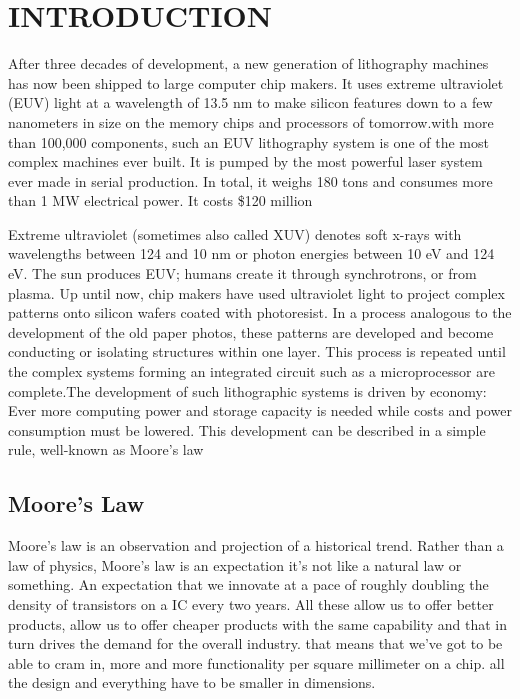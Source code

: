 \documentclass[12pt,a4paper]{report}
\begin{document}
\tableofcontents %
\listoffigures




    

\chapter{INTRODUCTION}
After three decades of development, a new generation of 
lithography machines has now been shipped to large 
computer chip makers. It uses extreme ultraviolet (EUV) 
light at a wavelength of 13.5 nm to make silicon 
features down to a few nanometers in size on the 
memory chips and processors of tomorrow.with more than 
100,000 components, such an EUV 
lithography system is one of the most complex 
machines ever built. It is pumped by the most 
powerful laser system ever made in serial production. 
In total, it weighs 180 tons and consumes more than 
1 MW electrical power. It costs \$120 million

Extreme ultraviolet (sometimes also called XUV) denotes 
soft x-rays with wavelengths between 124 and 10 nm or
 photon energies between 10 eV and 124 eV. 
 The sun produces EUV; humans create it through 
 synchrotrons, or from plasma.
Up until now, chip makers have used ultraviolet light to 
project complex patterns onto
 silicon wafers coated with photoresist. In a process 
 analogous to the development of the old paper photos, 
 these patterns are developed and become conducting or 
 isolating structures within one layer. This process is 
 repeated until the complex systems forming an 
 integrated circuit such as a microprocessor are 
 complete.The development of such lithographic systems is 
driven by economy: Ever more computing power 
and storage capacity is needed while costs and 
power consumption must be lowered. 
This development can be described in a simple rule, 
well-known as Moore’s law

\section{Moore's Law}
Moore's law is an observation and projection of a 
historical trend. Rather than a law 
of physics, Moore's law is an expectation it's 
not like a natural law or something. An expectation 
that we innovate at a pace of roughly doubling 
the density of transistors on a IC every two years.
All these allow us to 
offer better products, allow us to offer cheaper 
products with the same capability and that in 
turn drives the demand for the overall industry. 
that means that we've got to be able to cram in, 
more and more
functionality per square millimeter on a chip. all 
the design and everything have to be smaller in dimensions.
\end{document}

